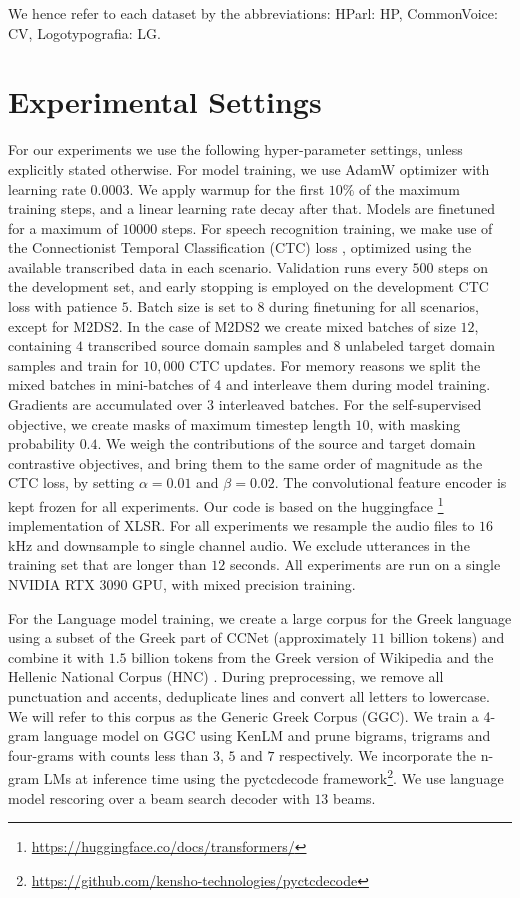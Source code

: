 \documentclass[journal]{IEEEtran}
\begin{document}
We hence refer to each dataset by the abbreviations: HParl: HP, CommonVoice: CV, Logotypografia: LG.

\section{Experimental Settings}
\label{sec:settings}
For our experiments we use the following hyper-parameter settings, unless explicitly stated otherwise. For model training, we use AdamW optimizer \cite{loshchilov2018decoupled} with learning rate $0.0003$. We apply warmup for the first $10\%$ of the maximum training steps, and a linear learning rate decay after that. Models are finetuned for a maximum of $10000$ steps. For speech recognition training, we make use of the Connectionist Temporal Classification (CTC) loss \cite{graves2006connectionist}, optimized using the available transcribed data in each scenario. Validation runs every $500$ steps on the development set, and early stopping is employed on the development CTC loss with patience $5$. Batch size is set to $8$ during finetuning for all scenarios, except for M2DS2. In the case of M2DS2 we create mixed batches of size $12$, containing $4$ transcribed source domain samples and $8$ unlabeled target domain samples and train for $10,000$ CTC updates. For memory reasons we split the mixed batches in mini-batches of $4$ and interleave them during model training. Gradients are accumulated over $3$ interleaved batches. For the self-supervised objective, we create masks of maximum timestep length $10$, with masking probability $0.4$. We weigh the contributions of the source and target domain contrastive objectives, and bring them to the same order of magnitude as the CTC loss, by setting $\alpha=0.01$ and $\beta=0.02$.
The convolutional feature encoder is kept frozen for all experiments. Our code is based on the huggingface \footnote{\url{https://huggingface.co/docs/transformers/}} implementation of XLSR. For all experiments we resample the audio files to $16$ kHz and downsample to single channel audio. We exclude utterances in the training set that are longer than $12$ seconds. All experiments are run on a single NVIDIA RTX 3090 GPU, with mixed precision training.

For the Language model training, we create a large corpus for the Greek language using a subset of the Greek part of CCNet \cite{wenzek2020ccnet} (approximately $11$ billion tokens) and combine it with $1.5$ billion tokens from the Greek version of Wikipedia and the Hellenic National Corpus (HNC) \cite{hatzigeorgiu2000design}.
During preprocessing, we remove all punctuation and accents, deduplicate lines and convert all letters to lowercase.
We will refer to this corpus as the Generic Greek Corpus (GGC).
We train a 4-gram language model on GGC using KenLM \cite{heafield2011kenlm} and prune bigrams, trigrams and four-grams with counts less than $3$, $5$ and $7$ respectively. We incorporate the n-gram LMs at inference time using the pyctcdecode framework\footnote{\url{https://github.com/kensho-technologies/pyctcdecode}}. We use language model rescoring over a beam search decoder with $13$ beams.
\end{document}
